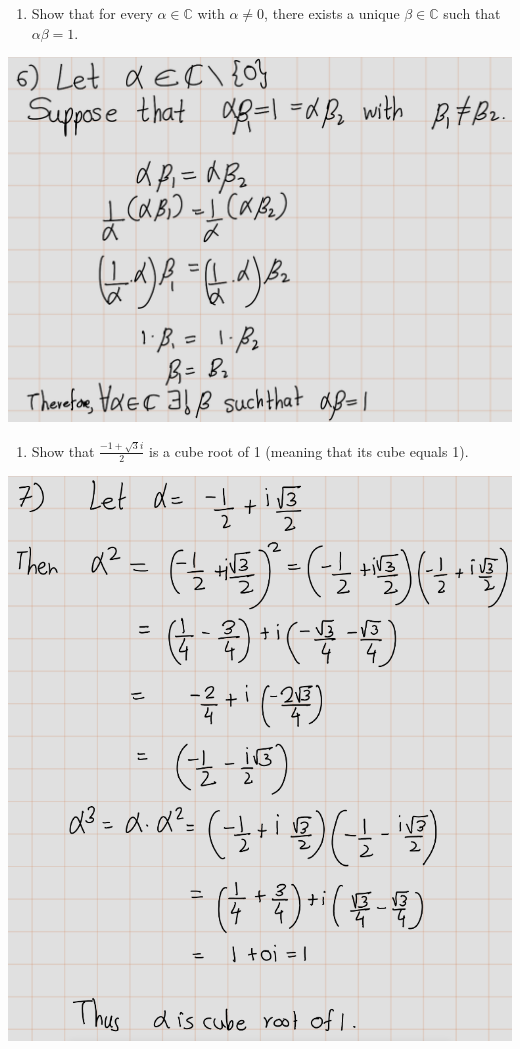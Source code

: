 \documentclass[
]{book}
\providecommand{\tightlist}{%
  \setlength{\itemsep}{0pt}\setlength{\parskip}{0pt}}
\theoremstyle{definition}
\theoremstyle{definition}
\theoremstyle{definition}
\theoremstyle{definition}
\theoremstyle{remark}
\begin{document}
\begin{enumerate}
\def\labelenumi{\arabic{enumi}.}
\setcounter{enumi}{5}
\tightlist
\item
  Show that for every \(\alpha \in \mathbb{C}\) with \(\alpha \neq 0\), there exists a unique \(\beta \in \mathbb{C}\) such that \(\alpha\beta = 1\).
\end{enumerate}

\includegraphics{fig/Ex1A/Ex6.png}

\begin{enumerate}
\def\labelenumi{\arabic{enumi}.}
\setcounter{enumi}{6}
\tightlist
\item
  Show that \(\frac{-1 + \sqrt{3}i}{2}\) is a cube root of 1 (meaning that its cube equals 1).
\end{enumerate}

\includegraphics{fig/Ex1A/Ex7.png}
\end{document}
